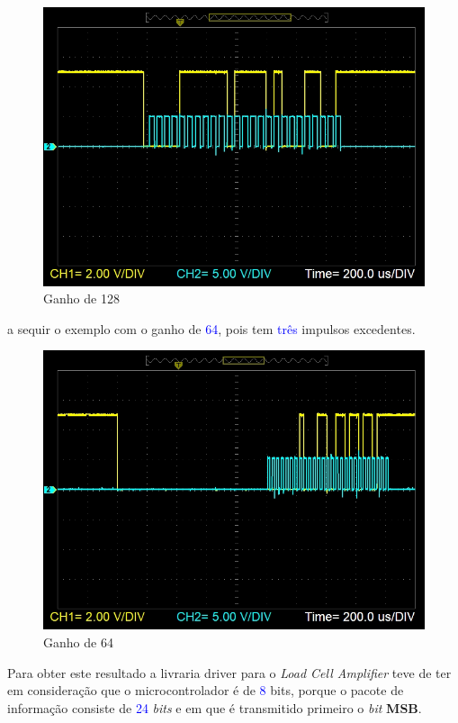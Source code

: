 \\
\begin{figure}[H]
	\centering
	\includegraphics[scale=0.35]{./image/PESTA/graph/80SPS128GAIN/Gain_128_example.JPG}
	\caption{Ganho de 128}
	\label{Gain_128_example}
\end{figure}
a sequir o exemplo com o ganho de \textcolor{blue}{64}, pois tem \textcolor{blue}{três} impulsos excedentes.
\begin{figure}[H]
	\centering
	\includegraphics[scale=0.35]{./image/PESTA/graph/80SPS64GAIN/Gain_64_example.JPG}
	\caption{Ganho de 64}
	\label{Gain_64_example}
\end{figure}
Para obter este resultado a livraria driver para o \textit{Load Cell Amplifier} teve de ter em consideração que o microcontrolador é de \textcolor{blue}{8} bits, porque o pacote de informação consiste de \textcolor{blue}{24} \textit{bits} e em que é transmitido primeiro o \textit{bit} \textbf{MSB}.
